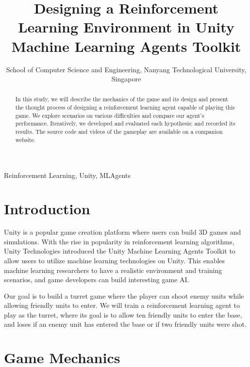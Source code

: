 \documentclass[conference]{IEEEtran}
\begin{document}
\title{Designing a Reinforcement Learning Environment in Unity Machine Learning Agents Toolkit}

\author{
School of Computer Science and Engineering, Nanyang Technological University, Singapore
}

\maketitle

\begin{abstract}
In this study, we will describe the mechanics of the game and its design and present the thought process of designing a reinforcement learning agent capable of playing this game. We explore scenarios on various difficulties and compare our agent's performance. Iteratively, we developed and evaluated each hypothesis; and recorded its results. The source code and videos of the gameplay are available on a companion website.
\end{abstract}

\begin{IEEEkeywords}
Reinforcement Learning, Unity, MLAgents
\end{IEEEkeywords}

\section{Introduction}

Unity is a popular game creation platform where users can build 3D games and simulations. With the rise in popularity in reinforcement learning algorithms, Unity Technologies introduced the Unity Machine Learning Agents Toolkit to allow users to utilize machine learning technologies on Unity. This enables machine learning researchers to have a realistic environment and training scenarios, and game developers can build interesting game AI.

Our goal is to build a turret game where the player can shoot enemy units while allowing friendly units to enter. We will train a reinforcement learning agent to play as the turret, where its goal is to allow ten friendly units to enter the base, and loses if an enemy unit has entered the base or if two friendly units were shot.

\section{Game Mechanics}
\end{document}
